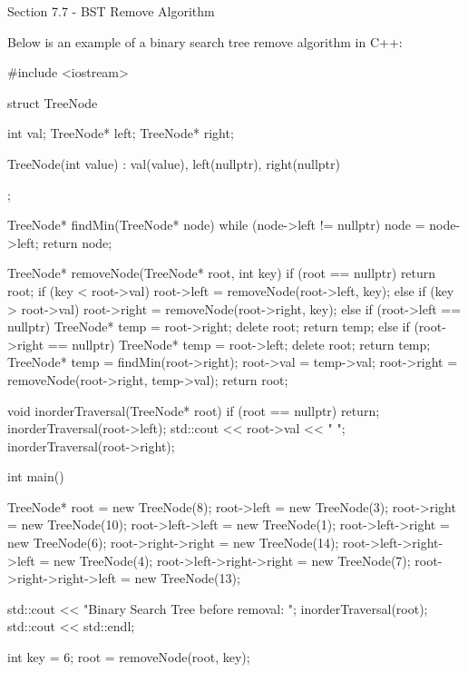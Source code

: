 \begin{notes}{Section 7.7 - BST Remove Algorithm}
    \begin{highlight}
        Below is an example of a binary search tree remove algorithm in C++:
    
    \begin{code}[C++]
    #include <iostream>
    
    struct TreeNode {
        int val;
        TreeNode* left;
        TreeNode* right;
    
        TreeNode(int value) : val(value), left(nullptr), right(nullptr) {}
    };
    
    TreeNode* findMin(TreeNode* node) {
        while (node->left != nullptr) {
            node = node->left;
        }
        return node;
    }
    
    TreeNode* removeNode(TreeNode* root, int key) {
        if (root == nullptr) {
            return root;
        }
        if (key < root->val) {
            root->left = removeNode(root->left, key);
        } else if (key > root->val) {
            root->right = removeNode(root->right, key);
        } else {
            if (root->left == nullptr) {
                TreeNode* temp = root->right;
                delete root;
                return temp;
            } else if (root->right == nullptr) {
                TreeNode* temp = root->left;
                delete root;
                return temp;
            }
            TreeNode* temp = findMin(root->right);
            root->val = temp->val;
            root->right = removeNode(root->right, temp->val);
        }
        return root;
    }
    
    void inorderTraversal(TreeNode* root) {
        if (root == nullptr) {
            return;
        }
        inorderTraversal(root->left);
        std::cout << root->val << " ";
        inorderTraversal(root->right);
    }
    
    int main() {
        TreeNode* root = new TreeNode(8);
        root->left = new TreeNode(3);
        root->right = new TreeNode(10);
        root->left->left = new TreeNode(1);
        root->left->right = new TreeNode(6);
        root->right->right = new TreeNode(14);
        root->left->right->left = new TreeNode(4);
        root->left->right->right = new TreeNode(7);
        root->right->right->left = new TreeNode(13);
    
        std::cout << "Binary Search Tree before removal: ";
        inorderTraversal(root);
        std::cout << std::endl;
    
        int key = 6;
        root = removeNode(root, key);
    
}
\end{code}
\end{highlight}
\end{notes}
